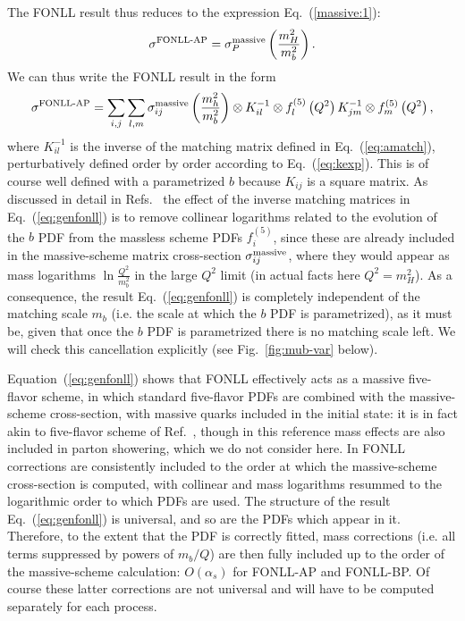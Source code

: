 The FONLL
result thus reduces to the expression Eq.~(\ref{massive:1}):
\begin{equation}\label{eq:canc}
\sigma^{\text{FONLL-AP}}=\sigma_P^{\rm
  massive}\left(\frac{m_H^2}{m_b^2}\right).
\end{equation}
We can thus write the FONLL result in the form
\begin{equation}\label{eq:genfonll}
\sigma^{\text{FONLL-AP}}= \sum_{i,j}\sum_{l,m} \sigma^{\rm massive}_{ij}\left(\frac{m_h^2}{m^2_b}\right)\otimes
 K^{-1}_{il}\otimes f_{l}^{\left(5\right)}\left(Q^2\right)K^{-1}_{jm}\otimes f_{m}^{\left(5\right)}\left(Q^2\right),
\end{equation}
where $ K^{-1}_{il}$ is the inverse of the matching matrix defined in
Eq.~(\ref{eq:amatch}), perturbatively defined order by order according
to Eq.~(\ref{eq:kexp}). This is
of course  well defined with a parametrized $b$ because
$K_{ij}$ is  a square matrix. As discussed in detail in
Refs.~\cite{Ball:2015tna,Ball:2015dpa} the effect of the inverse
matching matrices in Eq.~(\ref{eq:genfonll}) is to remove collinear
logarithms related to the evolution of the $b$ PDF from the massless scheme
PDFs $f_{i}^{\left(5\right)}$, since these are already included in the
massive-scheme matrix cross-section  $\sigma^{\rm massive}_{ij}$,
where they would appear as mass logarithms $\ln\frac{Q^2}{m_b^2}$
in the large $Q^2$ limit (in actual facts here $Q^2=m_H^2$). As a
consequence, the result Eq.~(\ref{eq:genfonll}) is completely
independent of the matching scale $m_b$ (i.e. the scale at which the
$b$ PDF is parametrized), as it must be, given that once
the $b$ PDF is parametrized there is no matching scale left.
We will check this cancellation explicitly (see 
Fig.~\ref{fig:mub-var} below).

Equation~(\ref{eq:genfonll}) shows that FONLL effectively acts
as a massive five-flavor scheme, in which standard five-flavor PDFs
are combined with the massive-scheme cross-section, with massive
quarks included in the initial state: it is in fact akin to 
five-flavor scheme of Ref.~\cite{Krauss:2017wmx}, though in this
reference mass effects are also included in parton showering, which we
do not consider here. In FONLL corrections are consistently
included to the order at which the massive-scheme cross-section is
computed, with collinear and mass logarithms resummed to the logarithmic
order to which PDFs are used. The structure of the result
Eq.~(\ref{eq:genfonll}) is universal, and so are the PDFs which appear
in it. Therefore, to the extent that the  PDF is correctly fitted,
mass corrections (i.e. all terms suppressed by powers of $m_b/Q$) are
then fully included  up to the order of the massive-scheme
calculation:   $O(\alpha_s)$ for FONLL-AP and FONLL-BP. Of course
these latter corrections are not universal and will have to be computed
separately for each process.

